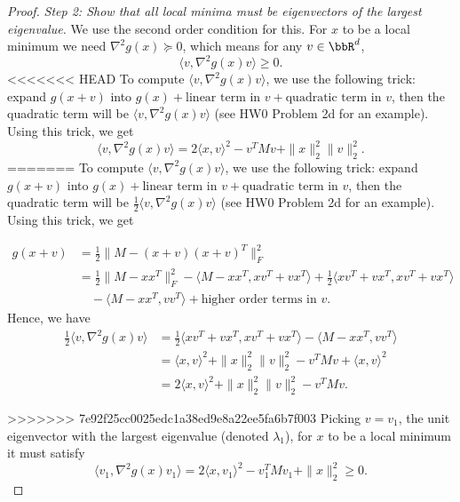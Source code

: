 \begin{definition} 
\begin{proof}
\textit{Step 2: Show that all local minima must be eigenvectors of the largest eigenvalue.} We use the second order condition for this. For $x$ to be a local minimum we need $\nabla^2g(x) \succeq 0$, which means for any $v \in  \bbR^d$, 
\begin{equation}
\langle v, \nabla^2g(x) v \rangle \geq 0.
\end{equation}
<<<<<<< HEAD
To compute $\langle v, \nabla^2g(x) v \rangle$, we use the following trick: expand $g(x + v)$ into $g(x) + \text{linear term in } v + \text{quadratic term in } v$, then the quadratic term will be $\langle v, \nabla^2g(x) v \rangle$ (see HW0 Problem 2d for an example). Using this trick, we get 
\begin{equation}
\langle v, \nabla^2g(x) v \rangle = 2\langle x, v \rangle^2 - v^TMv + \|x\|_2^2\|v\|_2^2. 
\end{equation}
=======
To compute $\langle v, \nabla^2g(x) v \rangle$, we use the following trick: expand $g(x + v)$ into $g(x) + \text{linear term in } v + \text{quadratic term in } v$, then the quadratic term will be $\frac{1}{2}\langle v, \nabla^2g(x) v \rangle$ (see HW0 Problem 2d for an example). Using this trick, we get 

\begin{align}
    g(x+v) &= \frac{1}{2}\|M - (x+v)(x+v)^T\|_F^2 \\
           &= \frac{1}{2}\|M-xx^T\|_F^2 - \langle M-xx^T, xv^T + vx^T\rangle + \frac{1}{2}\langle xv^T + vx^T, xv^T + vx^T \rangle \nonumber \\
          & \quad -\langle M-xx^T, vv^T\rangle + \text{higher order terms in }v.
\end{align}
Hence, we have 
\begin{align}
    \frac{1}{2}\langle v, \nabla^2g(x) v \rangle & = \frac{1}{2}\langle xv^T + vx^T, xv^T + vx^T \rangle
          -\langle M-xx^T, vv^T\rangle  \\
          &= \langle x, v\rangle^2 + \|x\|_2^2\|v\|_2^2 - v^TMv + \langle x, v\rangle^2 \\
          & = 2\langle x, v\rangle^2 + \|x\|_2^2\|v\|_2^2 - v^TMv.
\end{align}

>>>>>>> 7e92f25cc0025edc1a38ed9e8a22ee5fa6b7f003
Picking $v = v_1$, the unit eigenvector with the largest eigenvalue (denoted $\lambda_1$), for $x$ to be a local minimum it must satisfy 
\begin{equation}
\langle v_1, \nabla^2g(x) v_1 \rangle = 2\langle x, v_1 \rangle^2 - v_1^TMv_1 + \|x\|_2^2 \geq 0.
\end{equation}


\end{proof}
\end{definition}
